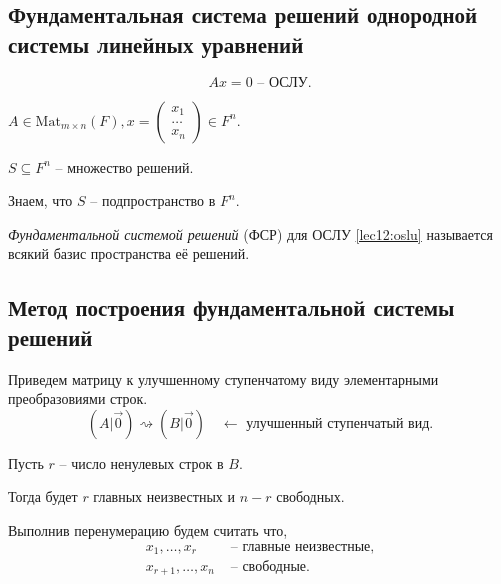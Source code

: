 \subsection{Фундаментальная система решений однородной системы линейных уравнений}

\begin{equation*}
    \tag{$\star$}
    \label{lec12:oslu}
    Ax = 0 \text{ -- ОСЛУ}
.\end{equation*}

$A \in \text{Mat}_{m \times n}(F), x = \begin{pmatrix} x_1 \\ \dots \\ x_n \end{pmatrix} \in F^n$.

$S \subseteq F^n$ -- множество решений.

Знаем, что $S$ -- подпространство в $F^n$.

\begin{definition}
    \textit{Фундаментальной системой решений} (ФСР) для ОСЛУ \eqref{lec12:oslu} называется всякий базис пространства её решений.
\end{definition}

\begin{comment}
    У одной ОСЛУ может быть много разных ФСР.
\end{comment}


\subsection{Метод построения фундаментальной системы решений}

Приведем матрицу к улучшенному ступенчатому виду элементарными преобразовиями строк.
\begin{equation*}
    (A | \overrightarrow{0}) \rightsquigarrow (B | \overrightarrow{0}) \quad \leftarrow \text{ улучшенный ступенчатый вид}
.\end{equation*}

Пусть $r$ -- число ненулевых строк в $B$.

Тогда будет $r$ главных неизвестных и $n - r$ свободных.

Выполнив перенумерацию будем считать что,
\begin{align*}
    x_1, \dots, x_r &\text{ -- главные неизвестные,} \\
    x_{r + 1}, \dots, x_n &\text{ -- свободные}
.\end{align*}


